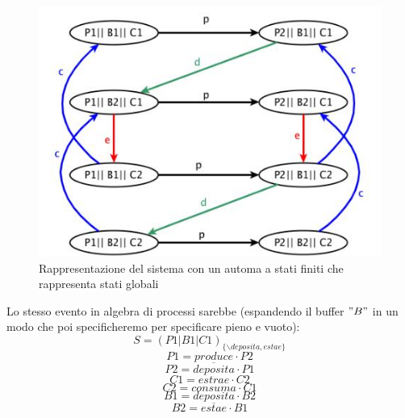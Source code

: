 \begin{esempio}
\begin{center}
  \end{center}
  \begin{figure}[H]
    \centering
    \includegraphics[scale = 0.6]{img/prod3.jpg}
    \caption{Rappresentazione del sistema con un automa a stati finiti che
      rappresenta stati globali}
  \end{figure}
  Lo stesso evento in algebra di processi sarebbe (espandendo il buffer $"B"$ in
  un modo che poi specificheremo per specificare pieno e vuoto):
  \[S=(P1|B1|C1)_{\{\backslash deposita, estae\}}\]
  \[P1=produce\cdot P2\]
  \[P2=\overline{deposita}\cdot P1\]
  \[C1=estrae\cdot C2\]
  \[C2=consuma\cdot C1\]
  \[B1=deposita\cdot B2\]
  \[B2=\overline{estae}\cdot B1\]
\end{esempio}

